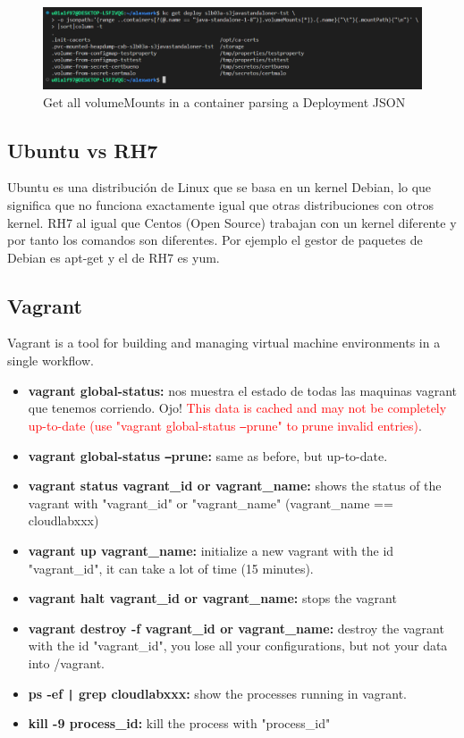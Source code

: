\documentclass{article}
\begin{document}
\begin{figure}[H]
    \centering
    \includegraphics[scale=0.35]{pictures/image23.png}
    \caption{Get all volumeMounts in a container parsing a Deployment JSON}
    \label{parsing json 5}
\end{figure}

\subsection{Ubuntu vs RH7}
Ubuntu es una distribución de Linux que se basa en un kernel Debian, lo que significa que no funciona exactamente igual que otras distribuciones con otros kernel. RH7 al igual que Centos (Open Source) trabajan con un kernel diferente y por tanto los comandos son diferentes. Por ejemplo el gestor de paquetes de Debian es apt-get y el de RH7 es yum.

\subsection{Vagrant}
Vagrant is a tool for building and managing virtual machine environments in a single workflow.

\begin{itemize}
    \item \textbf{vagrant global-status:} nos muestra el estado de todas las maquinas vagrant que tenemos corriendo. Ojo! \textcolor{red}{This data is cached and may not be completely up-to-date (use "vagrant global-status \texttt{--}prune" to prune invalid entries)}.
    \item \textbf{vagrant global-status \texttt{--}prune:} same as before, but up-to-date.
   \item \textbf{vagrant status vagrant\_id or vagrant\_name:} shows the status of the vagrant with "vagrant\_id" or "vagrant\_name" (vagrant\_name == cloudlabxxx)
   \item \textbf{vagrant up vagrant\_name:} initialize a new vagrant with the id "vagrant\_id", it can take a lot of time (15 minutes).
   \item \textbf{vagrant halt vagrant\_id or vagrant\_name:} stops the vagrant
   \item \textbf{vagrant destroy -f vagrant\_id or vagrant\_name:} destroy the vagrant with the id "vagrant\_id", you lose all your configurations, but not your data into /vagrant.
   \item \textbf{ps -ef \texttt{|} grep cloudlabxxx:} show the processes running in vagrant.
   \item \textbf{kill -9 process\_id:} kill the process with "process\_id"
\end{itemize}
\end{document}
